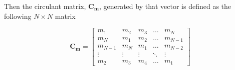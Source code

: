 \documentclass[11pt]{article}
\def \m {\mathbf{m}}
\begin{document}
Then the circulant matrix, $\mathbf{C}_{\m}$, generated by that vector is defined as the following $N \times N$ matrix

\begin{equation} \label{eq:circulant matrix}
    \mathbf{C}_{\m} = 
    	\begin{bmatrix}
		    m_{1}  & m_{2} & m_{3} & \dots & m_{N} \\
		    m_{N}  & m_{1} & m_{2} & \dots & m_{N-1} \\
		    m_{N-1}  & m_{N} & m_{1} & \dots & m_{N-2} \\
	    	\vdots & \vdots & \vdots & \ddots & \vdots \\
		    m_{2}  & m_3 & m_4 & \dots & m_{1}
		\end{bmatrix}
\end{equation}



\end{document}
